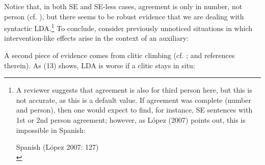 \documentclass[output=paper]{langsci/langscibook}
\begin{document}
Notice that, in both SE and SE-less cases, agreement is only in number, not person (cf. \citealt{Etxepare2005}), but there seems to be robust evidence that we are dealing with syntactic LDA.\footnote{%
    A reviewer suggests that agreement is also for third person here, but this is not accurate, as this is a default value. If agreement was complete (number and person), then one would expect to find, for instance, SE sentences with 1st or 2nd person agreement; however, as López (2007) points out, this is impossible in Spanish:
    
    \ea Spanish (López 2007: 127)\\
    \z
    \z{}} 
To conclude, consider previously unnoticed situations in which intervention-like effects arise in the context of an auxiliary: 

\ea%
    \label{ex:gallego:12}
    \z
\z

A second piece of evidence comes from clitic climbing (cf. \citealt{Gallego2016,Paradís 2016}; and references therein). As (13) shows, LDA is worse if a clitic stays in situ:
\end{document}
